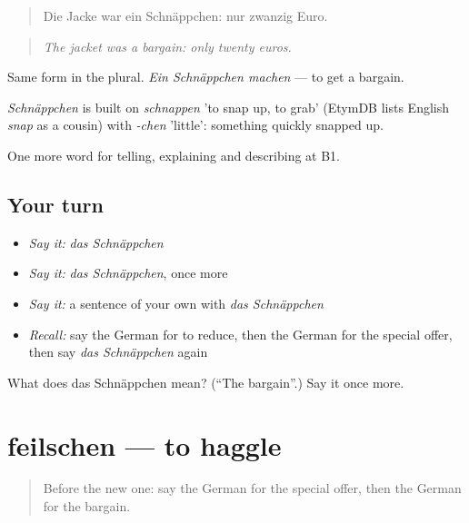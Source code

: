 \begin{quote}
Die Jacke war ein Schnäppchen: nur zwanzig Euro.
\end{quote}

\begin{quote}
\emph{The jacket was a bargain: only twenty euros.}
\end{quote}

Same form in the plural. \emph{Ein Schnäppchen machen} — to get a bargain.

\begin{cousinweb}
\emph{Schnäppchen} is built on \emph{schnappen} 'to snap up, to grab' (EtymDB lists English \emph{snap} as a cousin) with \emph{-chen} 'little': something quickly snapped up.
\end{cousinweb}

\begin{grammarlens}[title={What you've built}]
One more word for telling, explaining and describing at B1.
\end{grammarlens}

\subsection*{Your turn}
\begin{itemize}
\raggedright
  \item \emph{Say it:} \emph{das Schnäppchen}
  \item \emph{Say it:} \emph{das Schnäppchen}, once more
  \item \emph{Say it:} a sentence of your own with \emph{das Schnäppchen}
  \item \emph{Recall:} say the German for to reduce, then the German for the special offer, then say \emph{das Schnäppchen} again
\end{itemize}

\begin{tcolorbox}[breakable,colback=teal!4,colframe=teal!35!black,title={Before you move on}]
What does das Schnäppchen mean? (\textquotedblleft{}The bargain\textquotedblright{}.) Say it once more.
\end{tcolorbox}
\section[feilschen]{feilschen — to haggle}

\label{lesson:GE-C451-feilschen}



\begin{quote}
Before the new one: say the German for the special offer, then the German for the bargain.
\end{quote}

